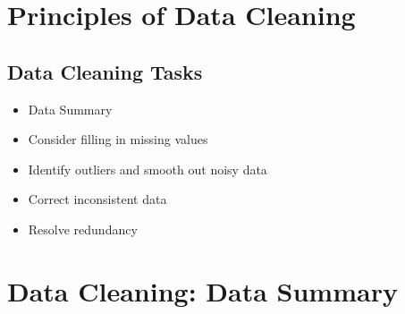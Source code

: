\documentclass[11pt]{article}
\theoremstyle{definition}
\begin{document}
\section{Principles of Data Cleaning}
\subsection{Data Cleaning Tasks}
\begin{itemize}
    \item Data Summary
    \item Consider filling in missing values
    \item Identify outliers and smooth out noisy data
    \item Correct inconsistent data
    \item Resolve redundancy
\end{itemize}

\section{Data Cleaning: Data Summary}
\end{document}

